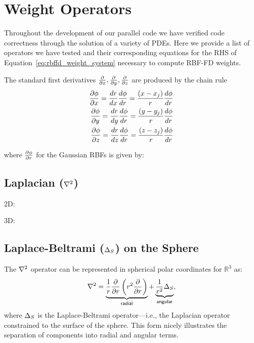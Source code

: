 \documentclass[11pt]{report}
\begin{document}
{ 

\section{Weight Operators}
Throughout the development of our parallel code we have verified code correctness through the solution of a variety of PDEs. Here we provide a list of operators we have tested and their corresponding equations for the RHS of Equation~\ref{eq:rbffd_weight_system} necessary to compute RBF-FD weights. 

The standard first derivatives $\frac{\partial }{\partial x}, \frac{\partial }{\partial y}, \frac{\partial }{\partial z}$ are produced by the chain rule
	\begin{align} 
	 \frac{\partial \phi}{\partial x} = \frac{d r}{d x} \frac{d \phi}{d r} = \frac{(x-x_{j})}{r} \frac{d \phi}{d r} \\
	 \frac{\partial \phi}{\partial y} = \frac{d r}{d y} \frac{d \phi}{d r} = \frac{(y-y_{j})}{r} \frac{d \phi}{d r} \\
	 \frac{\partial \phi}{\partial z} = \frac{d r}{d z} \frac{d \phi}{d r} = \frac{(z-z_{j})}{r} \frac{d \phi}{d r}
	\end{align}

where $\frac{\partial \phi}{\partial r}$ for the Gaussian RBFs is given by: 


\subsection{Laplacian ($\Laplacian$)}

2D: 

3D: 

\subsection{Laplace-Beltrami ($\LaplaceBeltrami$) on the Sphere}

The $\Laplacian$ operator can be represented in spherical polar coordinates for $\mathbb{R}^3$ as: 
\begin{align} 
\nabla^2 = \underbrace{\frac{1}{r} \frac{\partial }{\partial r} \left( r^{2} \frac{\partial }{\partial r}  \right)}_{\mathsf{radial}} + \underbrace{\frac{1}{r^2} \Delta_{S}}_{\mathsf{angular}} , \label{eq:laplacian_in_spherical}
\end{align}
where $\LaplaceBeltrami$ is the Laplace-Beltrami operator---i.e., the Laplacian operator constrained to the surface of the sphere. This form nicely illustrates the separation of components into radial and angular terms. 

}
\end{document}
